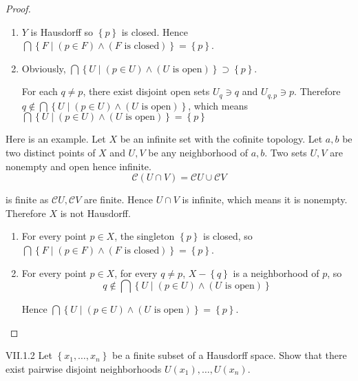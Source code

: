 \begin{proof}
	\begin{enumerate}[label={(\alph*)}]
		\item \( Y \) is Hausdorff so \( \left\{ p \right\} \) is closed. Hence \( \bigcap \left\{ F \mid (p \in F) \land (F\text{ is closed}) \right\} = \left\{ p \right\} \).
		\item Obviously, \( \bigcap \left\{ U \mid (p \in U) \land (U\text{ is open}) \right\} \supset \left\{ p \right\} \).

		      For each \( q \ne p \), there exist disjoint open sets \( U_{q} \ni q \) and \( U_{q,p} \ni p \). Therefore \( q \notin \bigcap \left\{ U \mid (p \in U) \land (U\text{ is open}) \right\} \), which means \( \bigcap \left\{ U \mid (p \in U) \land (U\text{ is open}) \right\} = \left\{ p \right\} \)
	\end{enumerate}

	\bigskip
	Here is an example. Let \( X \) be an infinite set with the cofinite topology. Let \( a, b \) be two distinct points of \( X \) and \( U, V \) be any neighborhood of \( a, b \). Two sets \( U, V \) are nonempty and open hence infinite.
	\[
		\mathscr{C}(U \cap V) = \mathscr{C}U \cup \mathscr{C}V
	\]

	is finite as \( \mathscr{C}U, \mathscr{C}V \) are finite. Hence \( U \cap V \) is infinite, which means it is nonempty. Therefore \( X \) is not Hausdorff.
	\begin{enumerate}[label={(\alph*)}]
		\item For every point \( p \in X \), the singleton \( \left\{ p \right\} \) is closed, so \( \bigcap \left\{ F \mid (p \in F) \land (F\text{ is closed}) \right\} = \left\{ p \right\} \).
		\item For every point \( p \in X \), for every \( q \ne p \), \( X - \left\{ q \right\} \) is a neighborhood of \( p \), so
		      \[
			      q \notin \bigcap \left\{ U \mid (p \in U) \land (U\text{ is open}) \right\}
		      \]

		      Hence \( \bigcap \left\{ U \mid (p \in U) \land (U\text{ is open}) \right\} = \left\{ p \right\} \).
	\end{enumerate}
\end{proof}

\begin{problem}{VII.1.2}\label{problem:VII.1.2}
Let \( \left\{ x_{1}, \ldots, x_{n} \right\} \) be a finite subset of a Hausdorff space. Show that there exist pairwise disjoint neighborhoods \( U(x_{1}), \ldots, U(x_{n}) \).
\end{problem}

